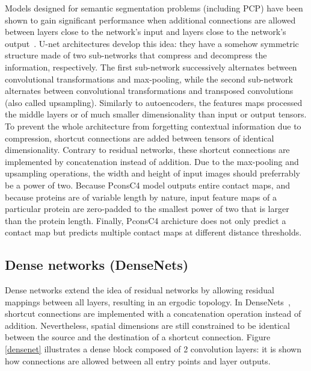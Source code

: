         Models designed for semantic segmentation problems (including PCP) have been shown
        to gain significant performance when additional connections are allowed between
        layers close to the network's input and layers close to the network's output~\cite{huang2017densely}.
        U-net architectures develop this idea: they have a somehow symmetric structure made of two sub-networks
        that compress and decompress the information, respectively.
        The first sub-network successively alternates between convolutional transformations
        and max-pooling, while the second sub-network alternates between convolutional
        transformations and transposed convolutions (also called upsampling).
        Similarly to autoencoders, the features maps
        processed the middle layers or of much smaller dimensionality than input or output tensors.
        To prevent the whole architecture from forgetting contextual information due to
        compression, shortcut connections are added between tensors of identical dimensionality.
        Contrary to residual networks, these shortcut connections are implemented by
        concatenation instead of addition. Due to the max-pooling and upsampling operations,
        the width and height of input images should preferrably be a power of two.
        Because PconsC4 model outputs entire contact maps, and because proteins are
        of variable length by nature, input feature maps of a particular protein are zero-padded
        to the smallest power of two that is larger than the protein length.
        Finally, PconsC4 archicture does not only predict a contact map but predicts multiple contact maps
        at different distance thresholds.

    \subsection{Dense networks (DenseNets)}

        Dense networks extend the idea of residual networks by allowing residual mappings
        between all layers, resulting in an ergodic topology. In DenseNets~\cite{huang2017densely},
        shortcut connections are implemented with a concatenation operation instead of addition.
        Nevertheless, spatial dimensions are still constrained to be identical between the source and the destination
        of a shortcut connection. Figure \ref{densenet} illustrates a dense block composed of
        2 convolution layers: it is shown how connections are allowed between all entry points and layer outputs.

